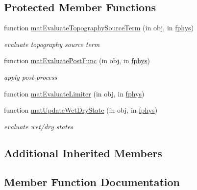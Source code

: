 \subsection*{Protected Member Functions}
\begin{DoxyCompactItemize}
\item 
function \hyperlink{class_s_w_e_w_d1d_adcf1f163b1780f68f7e9aefb76870301}{mat\+Evaluate\+Topography\+Source\+Term} (in obj, in \hyperlink{class_ndg_phys_a6b25724fc9474d32018439009072f0a9}{fphys})
\begin{DoxyCompactList}\small\item\em evaluate topography source term \end{DoxyCompactList}\item 
function \hyperlink{class_s_w_e_w_d1d_a63890cfc37ddbd7508b1089293dc301c}{mat\+Evaluate\+Post\+Func} (in obj, in \hyperlink{class_ndg_phys_a6b25724fc9474d32018439009072f0a9}{fphys})
\begin{DoxyCompactList}\small\item\em apply post-\/process \end{DoxyCompactList}\item 
function \hyperlink{class_s_w_e_w_d1d_a91c5ed29c5a1f7d4642bc54ad63bf14d}{mat\+Evaluate\+Limiter} (in obj, in \hyperlink{class_ndg_phys_a6b25724fc9474d32018439009072f0a9}{fphys})
\item 
function \hyperlink{class_s_w_e_w_d1d_aac1cdc6c307e100a9d133b145950459e}{mat\+Update\+Wet\+Dry\+State} (in obj, in \hyperlink{class_ndg_phys_a6b25724fc9474d32018439009072f0a9}{fphys})
\begin{DoxyCompactList}\small\item\em evaluate wet/dry states \end{DoxyCompactList}\end{DoxyCompactItemize}
\subsection*{Additional Inherited Members}


\subsection{Member Function Documentation}
\mbox{\label{class_s_w_e_w_d1d_a4212cf1a34a87a02fb60f29617d0d004}} 
